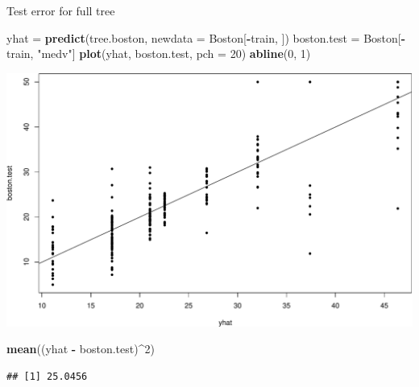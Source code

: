 \documentclass[ignorenonframetext,]{beamer}
\newenvironment{Shaded}{\begin{snugshade}}{\end{snugshade}}
\newcommand{\KeywordTok}[1]{\textcolor[rgb]{0.13,0.29,0.53}{\textbf{#1}}}
\newcommand{\DataTypeTok}[1]{\textcolor[rgb]{0.13,0.29,0.53}{#1}}
\newcommand{\DecValTok}[1]{\textcolor[rgb]{0.00,0.00,0.81}{#1}}
\newcommand{\StringTok}[1]{\textcolor[rgb]{0.31,0.60,0.02}{#1}}
\newcommand{\OperatorTok}[1]{\textcolor[rgb]{0.81,0.36,0.00}{\textbf{#1}}}
\newcommand{\NormalTok}[1]{#1}
\begin{document}
\begin{frame}[fragile]

\begin{block}{Test error for full tree}

\begin{Shaded}
\begin{Highlighting}[]
\NormalTok{yhat =}\StringTok{ }\KeywordTok{predict}\NormalTok{(tree.boston, }\DataTypeTok{newdata =}\NormalTok{ Boston[}\OperatorTok{-}\NormalTok{train, ])}
\NormalTok{boston.test =}\StringTok{ }\NormalTok{Boston[}\OperatorTok{-}\NormalTok{train, }\StringTok{"medv"}\NormalTok{]}
\KeywordTok{plot}\NormalTok{(yhat, boston.test, }\DataTypeTok{pch =} \DecValTok{20}\NormalTok{)}
\KeywordTok{abline}\NormalTok{(}\DecValTok{0}\NormalTok{, }\DecValTok{1}\NormalTok{)}
\end{Highlighting}
\end{Shaded}

\includegraphics{8TreesBEAMER_files/figure-beamer/unnamed-chunk-42-1.pdf}

\begin{Shaded}
\begin{Highlighting}[]
\KeywordTok{mean}\NormalTok{((yhat }\OperatorTok{-}\StringTok{ }\NormalTok{boston.test)}\OperatorTok{^}\DecValTok{2}\NormalTok{)}
\end{Highlighting}
\end{Shaded}

\begin{verbatim}
## [1] 25.0456
\end{verbatim}

\end{block}

\end{frame}
\end{document}
